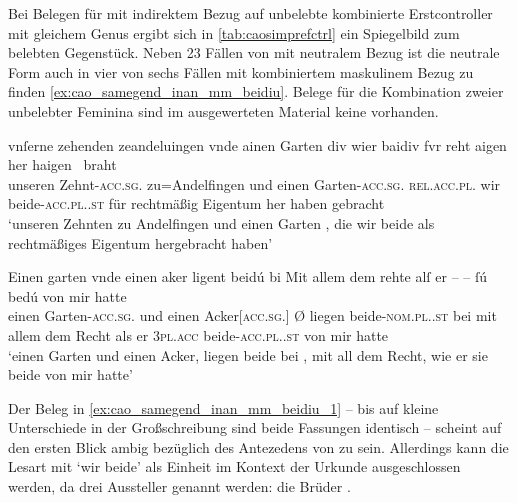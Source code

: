 Bei Belegen für  mit indirektem Bezug auf unbelebte kombinierte
Erstcontroller mit gleichem Genus ergibt sich in \cref{tab:caosimprefctrl} ein
Spiegelbild zum belebten Gegenstück. Neben 23 Fällen von  mit
neutralem Bezug ist die neutrale Form auch in vier von sechs Fällen mit
kombiniertem maskulinem Bezug zu finden \cref{ex:cao_samegend_inan_mm_beidiu}.
Belege für die Kombination zweier unbelebter Feminina sind im ausgewerteten
Material keine vorhanden.

\begin{exe}
\ex \label{ex:cao_samegend_inan_mm_beidiu}
	\begin{xlist}
	\ex \label{ex:cao_samegend_inan_mm_beidiu_1}
		\gll vnſerne zehenden zeandeluingen vnde ainen Garten
				\textelp{} div wier baidiv fvr reht aigen her
				haigen~ braht \\
			unseren Zehnt-\textsc{acc.sg}.\MascI{} zu=Andelfingen und einen
				Garten-\textsc{acc.sg.\MascI} {} \textsc{rel.acc.pl.\NeutI} wir
				beide-\textsc{acc.pl.\NeutI.st} für rechtmäßig Eigentum her haben
				gebracht \\
		\trans `unseren Zehnten zu Andelfingen und einen Garten \textelp{},
			die wir beide als recht\-mäßiges Eigentum hergebracht haben'
			\parencites(Nr.~1201~AB, Kl.~Heiligkreuztal, Kr.~Biberach, 1290)[472,10--18]{cao2}

	\ex \label{ex:cao_samegend_inan_mm_beidiu_2}
		\gll Einen garten vnde einen aker {}
				ligent beidú bi \textelp{} Mit allem dem rehte alſ er
				{-- --} ſú bedú von mir hatte \\
			einen Garten-\textsc{acc.sg.\MascI} und einen Acker[\textsc{acc.sg.\MascI}]
				Ø liegen beide-\textsc{nom.pl.\NeutI.st} bei {} mit allem dem
				Recht als er {} \textsc{3pl.acc} beide-\textsc{acc.pl.\NeutI.st} von mir
				hatte \\
		\trans `einen Garten und einen Acker,  liegen beide
			bei \textelp{}, mit all dem Recht, wie er sie beide von mir hatte'
			\parencites(Nr.~3249, Freiburg i.\,Br., 1299)[417,4--6]{cao4}
	\end{xlist}
\end{exe}

Der Beleg in \cref{ex:cao_samegend_inan_mm_beidiu_1} -- bis auf kleine
Unterschiede in der Großschreibung sind beide Fassungen identisch -- scheint
auf den ersten Blick ambig bezüglich des Antezedens von  zu sein.
Allerdings kann die Lesart mit  `wir beide' als Einheit
im Kontext der Urkunde ausgeschlossen werden, da drei Aussteller genannt
werden: die Brüder 
\autocite[\pno~1201~AB, 472.7]{cao2}.

